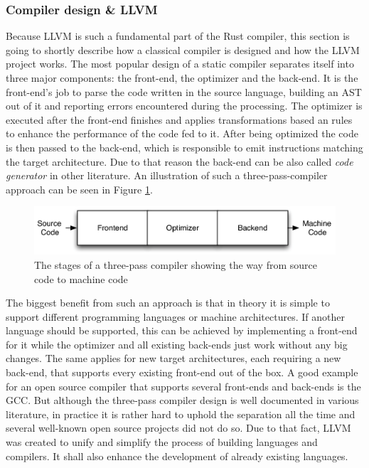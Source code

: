 \subsubsection{Compiler design \& LLVM}

Because \ac{LLVM} is such a fundamental part of the Rust compiler, this section is going to shortly describe how a classical compiler is designed and how the \ac{LLVM} project works.
The most popular design of a static compiler separates itself into three major components: the front-end, the optimizer and the back-end. It is the front-end's job to parse the code written in the source language, building an \ac{AST} out of it and reporting errors encountered during the processing. The optimizer is executed after the front-end finishes and applies transformations based an rules to enhance the performance of the code fed to it. After being optimized the code is then passed to the back-end, which is responsible to emit instructions matching the target architecture. Due to that reason the back-end can be also called \textit{code generator} in other literature. An illustration of such a three-pass-compiler approach can be seen in Figure \ref{fig:compiler_design}.

\begin{figure}[h!]
	\centering \includegraphics[width=\linewidth]{PICs/compiler_design.png}
	\caption{The stages of a three-pass compiler showing the way from source code to machine code}
	\label{fig:compiler_design}
\end{figure}

The biggest benefit from such an approach is that in theory it is simple to support different programming languages or machine architectures. If another language should be supported, this can be achieved by implementing a front-end for it while the optimizer and all existing back-ends just work without any big changes. The same applies for new target architectures, each requiring a new back-end, that supports every existing front-end out of the box. A good example for an open source compiler that supports several front-ends and back-ends is the GCC. But although the three-pass compiler design is well documented in various literature, in practice it is rather hard to uphold the separation all the time and several well-known open source projects did not do so. Due to that fact, \ac{LLVM} was created to unify and simplify the process of building languages and compilers. It shall also enhance the development of already existing languages. \cite{LLVM_ARCH}

